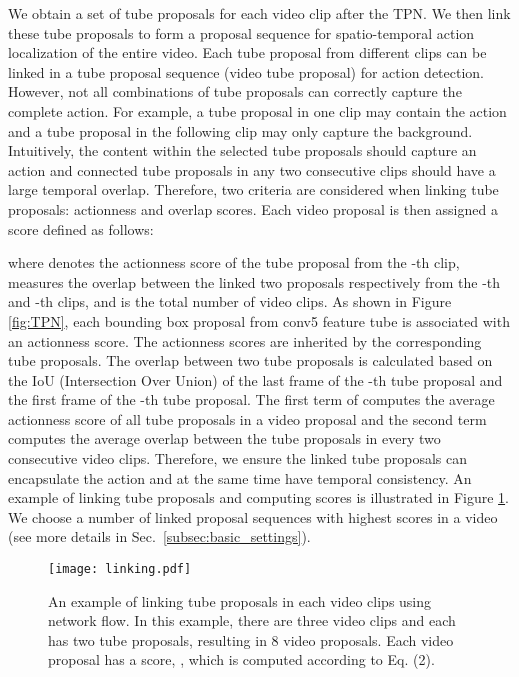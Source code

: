\documentclass[10pt,twocolumn,letterpaper]{article}
\begin{document}
We obtain  a set of tube proposals for each video clip after the TPN. We then link these tube proposals to form a proposal sequence for spatio-temporal action localization of the entire video.
Each tube proposal from different clips can be linked in a tube proposal sequence (\ie video tube proposal) for action detection. However, not all combinations of tube proposals can correctly capture the complete action. For example, a tube proposal in one clip may contain the action and a tube proposal in the following clip may only capture the background.  Intuitively, the content within the selected tube proposals should capture an action and connected tube proposals in any two consecutive clips should have a large temporal overlap. Therefore, two criteria are considered when linking tube proposals: actionness and overlap scores. Each video proposal is then assigned a score defined as follows:

where  denotes the actionness score of the tube proposal from the -th clip,  measures the overlap between the linked two proposals respectively from the -th and -th clips, and  is the total number of video clips. As shown in Figure \ref{fig:TPN}, each bounding box proposal from conv5 feature tube is associated with an actionness score. The actionness scores are inherited by the corresponding tube proposals. The overlap between two tube proposals is calculated based on the IoU (Intersection Over Union) of the last frame of the -th tube proposal and the first frame of the -th tube proposal. The first term of  computes the average actionness score of all tube proposals in a video proposal and the second term computes the average overlap between the tube proposals in every two consecutive video clips. Therefore, we ensure the linked tube proposals can encapsulate the action and at the same time have temporal consistency. An example of linking tube proposals and computing scores is illustrated in Figure \ref{fig:link}.
We choose a number of linked proposal sequences with highest scores in a video (see more details in Sec.~\ref{subsec:basic_settings}).

\begin{figure}[h]
\centering
\texttt{[image: linking.pdf]}
\caption{An example of linking tube proposals in each video clips using network flow. In this example, there are three video clips and each has two tube proposals, resulting in 8 video proposals. Each video proposal has a score, \eg , which is computed according to Eq. (2).}
\label{fig:link}
\end{figure}
\end{document}
